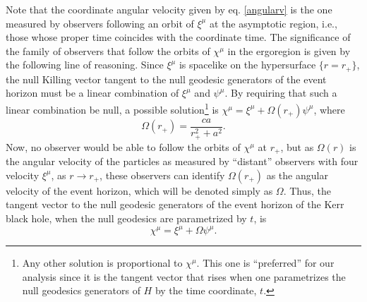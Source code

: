 \documentclass[
12pt,		%
openright,	%
twoside,  %
a4paper,			%
chapter=TITLE,		%
english,			%
french,				%
spanish,			%
brazil				%
]{USPSC-classe/USPSC}
\begin{document}
Note that the coordinate angular velocity given by eq. \ref{angularv} is the one measured by observers following an orbit of $\xi^{\mu}$ at the asymptotic region, i.e., those whose proper time coincides with the coordinate time. The significance of the family of observers that follow the orbits of $\chi^{\mu}$ in the ergoregion is given by the following line of reasoning. Since $\xi^{\mu}$ is spacelike on the hypersurface $\{r=r_+\}$, the null Killing vector tangent to the null geodesic generators of the event horizon must be a linear combination of $\xi^{\mu}$ and $\psi^{\mu}$. By requiring that such a linear combination be null, a possible solution\footnote{Any other solution is proportional to $\chi^{\mu}$. This one is ``preferred'' for our analysis since it is the tangent vector that rises when one parametrizes the null geodesics generators of $H$ by the time coordinate, $t$.} is $\chi^{\mu}=\xi^{\mu}+\Omega(r_+)\psi^{\mu}$, where 
\begin{equation}
    \Omega(r_+)=\frac{ca}{r_+^2+a^2}.
\end{equation}
Now, no observer would be able to follow the orbits of $\chi^{\mu}$ at $r_+$, but as $\Omega(r)$ is the angular velocity of the particles as measured by ``distant'' observers with four velocity $\xi^{\mu}$, as $r\to r_+$, these observers can identify $\Omega(r_+)$ as the angular velocity of the event horizon, which will be denoted simply as $\Omega$. Thus, the tangent vector to the null geodesic generators of the event horizon of the Kerr black hole, when the null geodesics are parametrized by $t$, is 
\begin{equation}\label{tangentH}
    \chi^{\mu}=\xi^{\mu}+\Omega\psi^{\mu}.
\end{equation}
\end{document}
